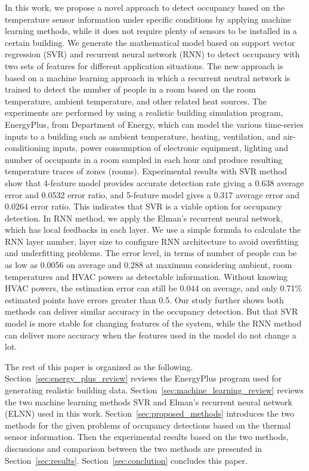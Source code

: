 In this work, we propose a novel approach to detect occupancy based on
the temperature sensor information under specific conditions by
applying machine learning methods, while it does not require plenty of
sensors to be installed in a certain building.  We generate the
mathematical model based on support vector regression (SVR) and
recurrent neural network (RNN) to detect occupancy with two sets of
features for different application situations. The new approach is
based on a machine learning approach in which a recurrent neutral
network is trained to detect the number of people in a room based on
the room temperature, ambient temperature, and other related heat
sources. The experiments are performed by using a realistic building
simulation program, EnergyPlus, from Department of Energy, which can
model the various time-series inputs to a building such as ambient
temperature, heating, ventilation, and air-conditioning inputs, power
consumption of electronic equipment, lighting and number of occupants
in a room sampled in each hour and produce resulting temperature
traces of zones (rooms).  Experimental results with SVR method show
that 4-feature model provides accurate detection rate giving a 0.638
average error and 0.0532 error ratio, and 5-feature model gives a
0.317 average error and 0.0264 error ratio. This indicates that SVR is
a viable option for occupancy detection.  In RNN method, we apply the
Elman's recurrent neural network, which has local feedbacks in each
layer. We use a simple formula to calculate the RNN layer number,
layer size to configure RNN architecture to avoid overfitting and
underfitting problems. The error level, in terms of number of people
can be as low as 0.0056 on average and 0.288 at maximum considering
ambient, room temperatures and HVAC powers as detectable
information. Without knowing HVAC powers, the estimation error can
still be 0.044 on average, and only 0.71\% estimated points have
errors greater than 0.5. Our study further shows both methods can
deliver similar accuracy in the occupancy detection.  But that SVR
model is more stable for changing features of the system, while the
RNN method can deliver more accuracy when the features used in the
model do not change a lot.


The rest of this paper is organized as the following.
Section~\ref{sec:energy_plus_review} reviews the EnergyPlus program
used for generating realistic building
data. Section~\ref{sec:machine_learning_review} reviews the two machine
learning methods SVR and Elman's recurrent neural network (ELNN) used
in this work. Section~\ref{sec:proposed_methods} introduces the two
methods for the given problems of occupancy detections based on the
thermal sensor information. Then the experimental results based on the
two methods, discussions and comparison between the two methods are
presented in Section~\ref{sec:results}. Section~\ref{sec:conclution}
concludes this paper.
